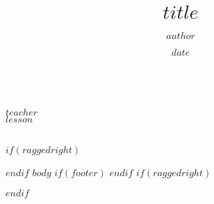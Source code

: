 \documentclass[$fontsize$, a4paper]{article}
\renewcommand{\maketitle}{
  \begin{flushleft}
    { \theauthor}\\
    { $teacher$}\\
    { $lesson$}\\
    { \thedate}\\
    \vspace{12pt}
    { \Large \bfseries \thetitle}
    \vspace{-2pt}
  \end{flushleft}
}
\begin{document}
\title{$title$}
\author{$author$}
\date{$date$}

\maketitle

$if(raggedright)$
\begin{FlushLeft}
$endif$
  $body$
  $if(footer)$
  \label{LastPage}
  $endif$
$if(raggedright)$
\end{FlushLeft}
$endif$
\end{document}
